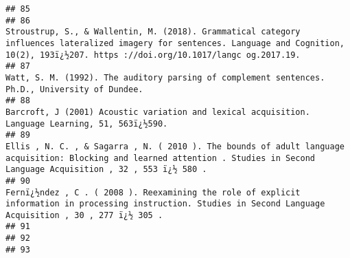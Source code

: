 \documentclass[
  english,
  man]{apa6}
\begin{document}
\begin{verbatim}
## 85                                                                                                                                                                                                                                                                                                                     
## 86                                                                                                                      Stroustrup, S., & Wallentin, M. (2018). Grammatical category influences lateralized imagery for sentences. Language and Cognition, 10(2), 193ï¿½207. https ://doi.org/10.1017/langc og.2017.19.
## 87                                                                                                                                                                                                                       Watt, S. M. (1992). The auditory parsing of complement sentences. Ph.D., University of Dundee.
## 88                                                                                                                                                                                                                     Barcroft, J (2001) Acoustic variation and lexical acquisition. Language Learning, 51, 563ï¿½590.
## 89                                                                                                                                      Ellis , N. C. , & Sagarra , N. ( 2010 ). The bounds of adult language acquisition: Blocking and learned attention . Studies in Second Language Acquisition , 32 , 553 ï¿½ 580 .
## 90                                                                                                                                                      Fernï¿½ndez , C . ( 2008 ). Reexamining the role of explicit information in processing instruction. Studies in Second Language Acquisition , 30 , 277 ï¿½ 305 .
## 91                                                                                                                                                                                                                                                                                                                     
## 92                                                                                                                                                                                                                                                                                                                     
## 93                                                                                                                                                                                                                                                                                                                     

\end{verbatim}
\end{document}
